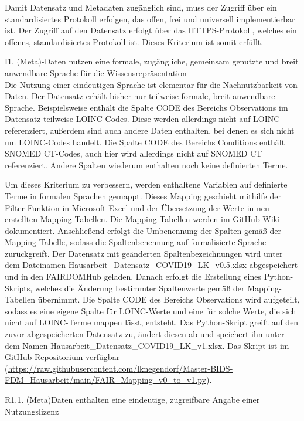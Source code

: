 \documentclass[12pt,a4paper,toc=bibliographynumbered,toc=indenttextentries]{scrreprt}
\begin{document}
\begin{description}
			Damit Datensatz und Metadaten zugänglich sind, muss der Zugriff über ein standardisiertes Protokoll erfolgen, das offen, frei und universell implementierbar ist.
			Der Zugriff auf den Datensatz erfolgt über das HTTPS-Protokoll, welches ein offenes, standardisiertes Protokoll ist. Dieses Kriterium ist somit erfüllt.
			\item I1. (Meta)-Daten nutzen eine formale, zugängliche, gemeinsam genutzte und breit anwendbare Sprache für die Wissensrepräsentation \\
			
			Die Nutzung einer eindeutigen Sprache ist elementar für die Nachnutzbarkeit von Daten. Der Datensatz erhält bisher nur teilweise formale, breit anwendbare Sprache. Beispielsweise enthält die Spalte CODE des Bereichs Observations im Datensatz teilweise LOINC-Codes. Diese werden allerdings nicht auf LOINC referenziert, außerdem sind auch andere Daten enthalten, bei denen es sich nicht um LOINC-Codes handelt. Die Spalte CODE des Bereichs Conditions enthält SNOMED CT-Codes, auch hier wird allerdings nicht auf SNOMED CT referenziert. Andere Spalten wiederum enthalten noch keine definierten Terme.\par
			Um dieses Kriterium zu verbessern, werden enthaltene Variablen auf definierte Terme in formalen Sprachen gemappt. Dieses Mapping geschieht mithilfe der Filter-Funktion in Microsoft Excel und der Übersetzung der Werte in neu erstellten Mapping-Tabellen. Die Mapping-Tabellen werden im GitHub-Wiki dokumentiert. Anschließend erfolgt die Umbenennung der Spalten gemäß der Mapping-Tabelle, sodass die Spaltenbenennung auf formalisierte Sprache zurückgreift. Der Datensatz mit geänderten Spaltenbezeichnungen wird unter dem Dateinamen \textsf{Hausarbeit\_Datensatz\_COVID19\_LK\_v0.5.xlsx} abgespeichert und in den FAIRDOMHub geladen. Danach erfolgt die Erstellung eines Python-Skripts, welches die Änderung bestimmter Spaltenwerte gemäß der Mapping-Tabellen übernimmt. Die Spalte CODE des Bereichs Observations wird aufgeteilt, sodass es eine eigene Spalte für LOINC-Werte und eine für solche Werte, die sich nicht auf LOINC-Terme mappen lässt, entsteht.
			Das Python-Skript greift auf den zuvor abgespeicherten Datensatz zu, ändert diesen ab und speichert ihn unter dem Namen \textsf{Hausarbeit\_Datensatz\_COVID19\_LK\_v1.xlsx}. Das Skript ist im GitHub-Repositorium verfügbar (\url{https://raw.githubusercontent.com/lknegendorf/Master-BIDS-FDM_Hausarbeit/main/FAIR_Mapping_v0_to_v1.py}).
			\item R1.1. (Meta)Daten enthalten eine eindeutige, zugreifbare Angabe einer Nutzungslizenz \\
			

\end{description}
\end{document}
